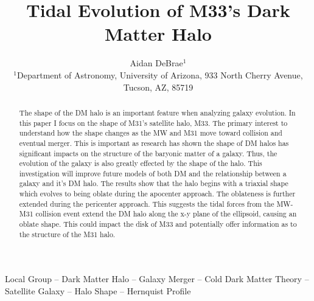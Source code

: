 \documentclass[usenatbib]{mnras}
\title{Tidal Evolution of M33’s Dark Matter Halo}
\author{
Aidan DeBrae$^{1}$
\\
$^{1}$Department of Astronomy, University of Arizona, 933 North Cherry Avenue, Tucson, AZ, 85719}
\begin{document}
\label{firstpage}
\pagerange{\pageref{firstpage}--\pageref{lastpage}}
\maketitle

\begin{abstract}
    The shape of the DM halo is an important feature when analyzing galaxy evolution. In this paper I focus on the shape of M31's satellite halo, M33. The primary interest to understand how the shape changes as the MW and M31 move toward collision and eventual merger. This is important as research has shown the shape of DM halos has significant impacts on the structure of the baryonic matter of a galaxy. Thus, the evolution of the galaxy is also greatly effected by the shape of the halo. This investigation will improve future models of both DM and the relationship between a galaxy and it's DM halo. The results show that the halo begins with a triaxial shape which evolves to being oblate during the apocenter approach. The oblateness is further extended during the pericenter approach. This suggests the tidal forces from the MW-M31 collision event extend the DM halo along the x-y plane of the ellipsoid, causing an oblate shape. This could impact the disk of M33 and potentially offer information as to the structure of the M31 halo.   
\end{abstract}
\begin{keywords}
Local Group -- Dark Matter Halo -- Galaxy Merger -- Cold Dark Matter Theory -- Satellite Galaxy -- Halo Shape -- Hernquist Profile
\end{keywords}


\end{document}
